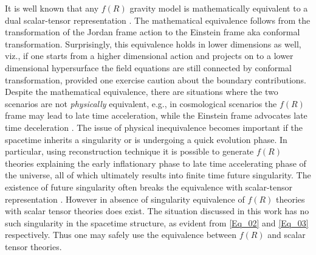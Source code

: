 \documentclass{article}
\begin{document}
It is well known that any $f(R)$ gravity model is mathematically equivalent to a dual scalar-tensor representation \cite{Barrow:1988xh,Capozziello:1996xg,Nojiri:2010wj,Sotiriou:2008rp,DeFelice:2010aj,Anand:2014vqa,Bahamonde:2016wmz,
Parry:2005eb,Catena:2006bd,Chiba:2013mha,Bhattacharya:2016lup}. The mathematical equivalence follows from the transformation of the Jordan frame action to the Einstein frame aka conformal transformation. Surprisingly, this equivalence holds in lower dimensions as well, viz., if one starts from a higher dimensional action and projects on to a lower dimensional hypersurface the field equations are still connected by conformal transformation, provided one exercise caution about the boundary contributions. Despite the mathematical equivalence, there are situations where the two scenarios are not \emph{physically} equivalent, e.g., in cosmological scenarios the $f(R)$ frame may lead to late time acceleration, while the Einstein frame advocates late time deceleration \cite{Briscese:2006xu,Bahamonde:2016wmz,Capozziello:2010sc}. The issue of physical inequivalence becomes important if the spacetime inherits a singularity or is undergoing a quick evolution phase. In particular, using reconstruction technique \cite{Nojiri:2009kx,Nojiri:2006be,Nojiri:2009xh,Carloni:2010ph} it is possible to generate $f(R)$ theories explaining the early inflationary phase to late time accelerating phase of the universe, all of which ultimately results into finite time future singularity. The existence of future singularity often breaks the equivalence with scalar-tensor representation \cite{Bamba:2008ut,Bahamonde:2016wmz}. However in absence of singularity \cite{Antoniadis:1993jc} equivalence of $f(R)$ theories with scalar tensor theories does exist. The situation discussed in this work has no such singularity in the spacetime structure, as evident from \ref{Eq_02} and \ref{Eq_03} respectively. Thus one may safely use the equivalence between $f(R)$ and scalar tensor theories. 
\end{document}
